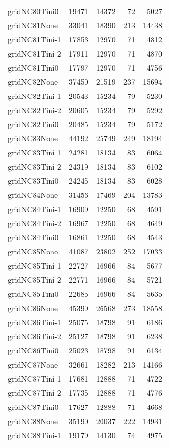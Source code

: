 \begin{longtable}{lrrrr}
gridNC80Tini0 & 19471 & 14372 & 72 & 5027 \\
gridNC81None & 33041 & 18390 & 213 & 14438 \\
gridNC81Tini-1 & 17853 & 12970 & 71 & 4812 \\
gridNC81Tini-2 & 17911 & 12970 & 71 & 4870 \\
gridNC81Tini0 & 17797 & 12970 & 71 & 4756 \\
gridNC82None & 37450 & 21519 & 237 & 15694 \\
gridNC82Tini-1 & 20543 & 15234 & 79 & 5230 \\
gridNC82Tini-2 & 20605 & 15234 & 79 & 5292 \\
gridNC82Tini0 & 20485 & 15234 & 79 & 5172 \\
gridNC83None & 44192 & 25749 & 249 & 18194 \\
gridNC83Tini-1 & 24281 & 18134 & 83 & 6064 \\
gridNC83Tini-2 & 24319 & 18134 & 83 & 6102 \\
gridNC83Tini0 & 24245 & 18134 & 83 & 6028 \\
gridNC84None & 31456 & 17469 & 204 & 13783 \\
gridNC84Tini-1 & 16909 & 12250 & 68 & 4591 \\
gridNC84Tini-2 & 16967 & 12250 & 68 & 4649 \\
gridNC84Tini0 & 16861 & 12250 & 68 & 4543 \\
gridNC85None & 41087 & 23802 & 252 & 17033 \\
gridNC85Tini-1 & 22727 & 16966 & 84 & 5677 \\
gridNC85Tini-2 & 22771 & 16966 & 84 & 5721 \\
gridNC85Tini0 & 22685 & 16966 & 84 & 5635 \\
gridNC86None & 45399 & 26568 & 273 & 18558 \\
gridNC86Tini-1 & 25075 & 18798 & 91 & 6186 \\
gridNC86Tini-2 & 25127 & 18798 & 91 & 6238 \\
gridNC86Tini0 & 25023 & 18798 & 91 & 6134 \\
gridNC87None & 32661 & 18282 & 213 & 14166 \\
gridNC87Tini-1 & 17681 & 12888 & 71 & 4722 \\
gridNC87Tini-2 & 17735 & 12888 & 71 & 4776 \\
gridNC87Tini0 & 17627 & 12888 & 71 & 4668 \\
gridNC88None & 35190 & 20037 & 222 & 14931 \\
gridNC88Tini-1 & 19179 & 14130 & 74 & 4975 \\

\end{longtable}
